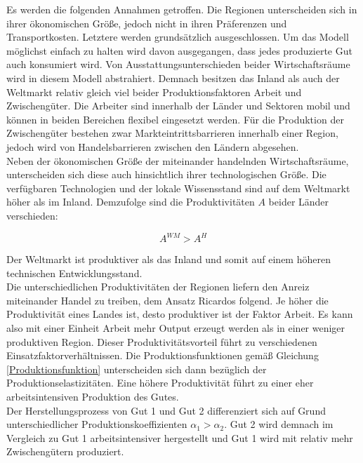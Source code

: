Es werden die folgenden Annahmen getroffen. Die Regionen unterscheiden sich in ihrer ökonomischen Grö{\ss}e, jedoch nicht in ihren Präferenzen und Transportkosten. Letztere  werden grundsätzlich ausgeschlossen. Um das Modell möglichst einfach zu halten wird davon ausgegangen, dass jedes produzierte Gut auch konsumiert wird. Von Ausstattungsunterschieden beider Wirtschaftsräume wird in diesem Modell abstrahiert. Demnach besitzen das Inland als auch der Weltmarkt relativ gleich viel beider Produktionsfaktoren Arbeit und Zwischengüter. Die Arbeiter sind innerhalb der Länder und Sektoren mobil und können in beiden Bereichen flexibel eingesetzt werden. Für die Produktion der Zwischengüter bestehen zwar Markteintrittsbarrieren innerhalb einer Region, jedoch wird von Handelsbarrieren zwischen den Ländern abgesehen.\\


Neben der ökonomischen Grö{\ss}e der miteinander handelnden Wirtschaftsräume, unterscheiden sich diese auch hinsichtlich ihrer technologischen Grö{\ss}e. Die verfügbaren Technologien und der lokale Wissensstand sind auf dem Weltmarkt höher als im Inland. Demzufolge sind die Produktivitäten $A$ beider Länder verschieden:


	\begin{equation}
		A^{WM}>A^{H}\label{verschiedene A}
	\end{equation}	


Der Weltmarkt ist produktiver als das Inland und somit auf einem höheren technischen Entwicklungsstand.\\
Die unterschiedlichen Produktivitäten der Regionen liefern den Anreiz miteinander Handel zu treiben, dem Ansatz Ricardos folgend. Je höher die Produktivität eines Landes ist, desto produktiver ist der Faktor Arbeit. Es kann also mit einer Einheit Arbeit mehr Output erzeugt werden als in einer weniger produktiven Region. Dieser Produktivitätsvorteil führt zu verschiedenen Einsatzfaktorverhältnissen. Die Produktionsfunktionen gemä{\ss} Gleichung \eqref{Produktionsfunktion} unterscheiden sich dann bezüglich der Produktionselastizitäten. Eine höhere Produktivität führt zu einer eher arbeitsintensiven Produktion des Gutes.\\  
Der Herstellungsprozess von Gut 1 und Gut 2 differenziert sich auf Grund unterschiedlicher Produktionskoeffizienten $\alpha_1 >\alpha_2$. Gut 2 wird demnach im Vergleich zu Gut 1 arbeitsintensiver hergestellt und Gut 1 wird mit relativ mehr Zwischengütern produziert.\\


